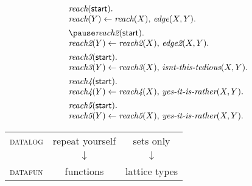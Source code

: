 \documentclass[aspectratio=169,dvipsnames]{beamer}
\newcommand\standout{\color{standout}}
\providecommand\displayfamily\rmfamily
\providecommand\strong[1]{{\bfseries#1}}
\newcommand\n\textit
\renewcommand\c\textsf
\newcommand\interlude{\Huge\standout\displayfamily}
\begin{document}

  \newcommand\conj{,\,}
  \begin{frame}{}
    \centering \strong{Datalog!}
    \begin{fleqn}[1em]
    \begin{minipage}[t][.35\paperheight]{\paperwidth}
      \[\begin{array}{l}
      \n{reach}(\c{start}).\\
      \n{reach}(Y) \gets \n{reach}(X)\conj \n{edge}(X,Y).\\[1ex]\pause
      \n{reach2}(\c{start}).\\
      \n{reach2}(Y) \gets \n{reach2}(X)\conj \n{edge2}(X,Y).\\[1ex]
      \n{reach3}(\c{start}).\\
      \n{reach3}(Y) \gets \n{reach3}(X)\conj \n{isnt-this-tedious}(X,Y).
      \\[1ex]
      \n{reach4}(\c{start}).\\
      \n{reach4}(Y) \gets \n{reach4}(X)\conj \n{yes-it-is-rather}(X,Y).
      \\[1ex]
      \n{reach5}(\c{start}).\\
      \n{reach5}(Y) \gets \n{reach5}(X)\conj \n{yes-it-is-rather}(X,Y).\\
      \end{array}\]
    \end{minipage}
    \end{fleqn}
  \end{frame}


  \begin{frame}
    \huge
    \begin{center}
      \addtolength\tabcolsep{.75ex}
      \begin{tabular}{@{}lcc@{}}
        \scshape\color{Blue} datalog
        & \color{Red!80!black} repeat yourself
        & \color{Red!80!black} sets only
        \pause
        \\
        & $\downarrow$ & $\downarrow$
        \\
        \scshape\color{Blue} datafun
        & \color{Green!80!black} functions
        & \color{Green!80!black} lattice types
      \end{tabular}
    \end{center}
  \end{frame}


\end{document}
